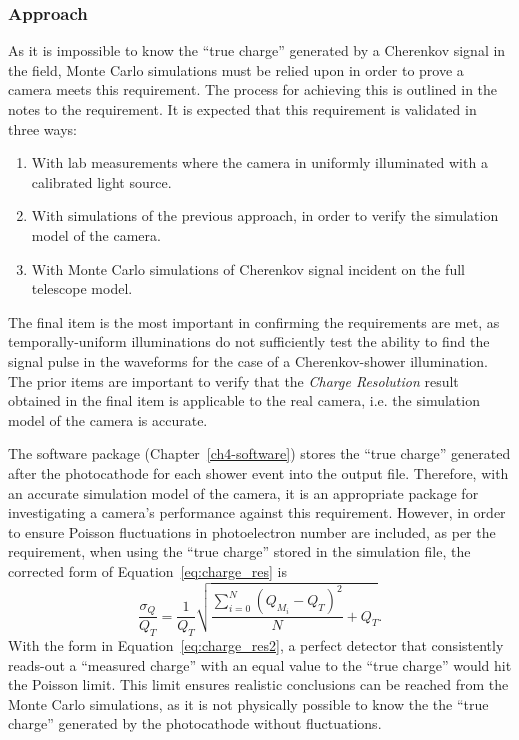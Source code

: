 \subsubsection{Approach}
As it is impossible to know the ``true charge'' generated by a Cherenkov signal in the field, Monte Carlo simulations must be relied upon in order to prove a camera meets this requirement. The process for achieving this is outlined in the notes to the requirement. It is expected that this requirement is validated in three ways:
\begin{enumerate}
\item With lab measurements where the camera in uniformly illuminated with a calibrated light source.
\item With simulations of the previous approach, in order to verify the simulation model of the camera.
\item With Monte Carlo simulations of Cherenkov signal incident on the full telescope model.
\end{enumerate}
The final item is the most important in confirming the requirements are met, as temporally-uniform illuminations do not sufficiently test the ability to find the signal pulse in the waveforms for the case of a Cherenkov-shower illumination. The prior items are important to verify that the \textit{Charge Resolution} result obtained in the final item is applicable to the real camera, i.e. the simulation model of the camera is accurate.

The software package  (Chapter~\ref{ch4-software}) stores the ``true charge'' generated after the photocathode for each shower event into the output file. Therefore, with an accurate simulation model of the camera, it is an appropriate package for investigating a camera's performance against this requirement. However, in order to ensure Poisson fluctuations in photoelectron number are included, as per the requirement, when using the ``true charge'' stored in the simulation file, the corrected form of Equation~\ref{eq:charge_res} is
\begin{equation} \label{eq:charge_res2}
\frac{\sigma_Q}{Q_T} = \frac{1}{Q_T} \sqrt{\frac{\sum_{i=0}^N (Q_{M_i} - Q_T)^2}{N} + Q_T}.
\end{equation}
With the form in Equation~\ref{eq:charge_res2}, a perfect detector that consistently reads-out a ``measured charge'' with an equal value to the ``true charge'' would hit the Poisson limit. This limit ensures realistic conclusions can be reached from the Monte Carlo simulations, as it is not physically possible to know the the ``true charge'' generated by the photocathode without fluctuations.

